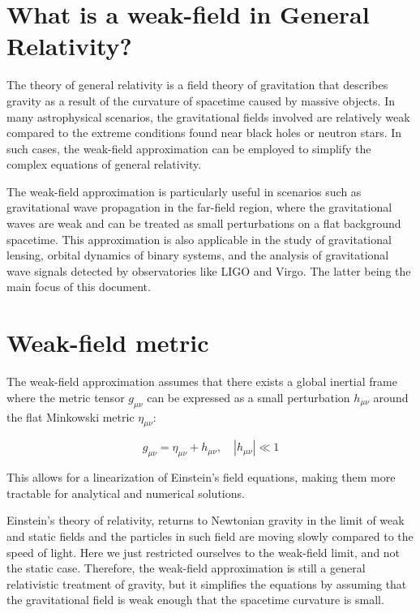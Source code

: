 \section{What is a weak-field in General Relativity?}\label{sec:what-is-a-weak-field-in-general-relativity?}

The theory of general relativity is a field theory of gravitation that describes gravity as a result of the curvature of spacetime caused by massive objects.
In many astrophysical scenarios, the gravitational fields involved are relatively weak compared to the extreme conditions found near black holes or neutron stars.
In such cases, the weak-field approximation can be employed to simplify the complex equations of general relativity.

The weak-field approximation is particularly useful in scenarios such as gravitational wave propagation in the far-field region, where the gravitational waves are weak and can be treated as small perturbations on a flat background spacetime.
This approximation is also applicable in the study of gravitational lensing, orbital dynamics of binary systems, and the analysis of gravitational wave signals detected by observatories like LIGO and Virgo.
The latter being the main focus of this document.


\section{Weak-field metric}\label{sec:weak-field-metric}
The weak-field approximation assumes that there exists a global inertial frame where the metric tensor $g_{\mu\nu}$ can be expressed as a small perturbation $h_{\mu\nu}$ around the flat Minkowski metric $\eta_{\mu\nu}$:

\begin{equation}
    g_{\mu\nu} = \eta_{\mu\nu} + h_{\mu\nu}, \quad |h_{\mu\nu}| \ll 1\label{eq:weak-field-metric}
\end{equation}

This allows for a linearization of Einstein's field equations, making them more tractable for analytical and numerical solutions.

Einstein's theory of relativity, returns to Newtonian gravity in the limit of weak and static fields and the particles in such field are moving slowly compared to the speed of light.
Here we just restricted ourselves to the weak-field limit, and not the static case.
Therefore, the weak-field approximation is still a general relativistic treatment of gravity, but it simplifies the equations by assuming that the gravitational field is weak enough that the spacetime curvature is small.

